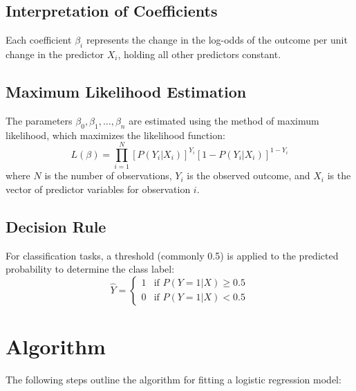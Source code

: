 \documentclass{article}
\begin{document}
\subsection{Interpretation of Coefficients}

Each coefficient \( \beta_i \) represents the change in the log-odds of the outcome per unit change in the predictor \( X_i \), holding all other predictors constant.

\subsection{Maximum Likelihood Estimation}

The parameters \( \beta_0, \beta_1, \dots, \beta_n \) are estimated using the method of maximum likelihood, which maximizes the likelihood function:
\[
L(\beta) = \prod_{i=1}^{N} [P(Y_i|X_i)]^{Y_i} [1 - P(Y_i|X_i)]^{1 - Y_i}
\]
where \( N \) is the number of observations, \( Y_i \) is the observed outcome, and \( X_i \) is the vector of predictor variables for observation \( i \).

\subsection{Decision Rule}

For classification tasks, a threshold (commonly 0.5) is applied to the predicted probability to determine the class label:
\[
\hat{Y} = 
\begin{cases} 
1 & \text{if } P(Y=1|X) \geq 0.5 \\ 
0 & \text{if } P(Y=1|X) < 0.5 
\end{cases}
\]

\section{Algorithm}

The following steps outline the algorithm for fitting a logistic regression model:
\end{document}
